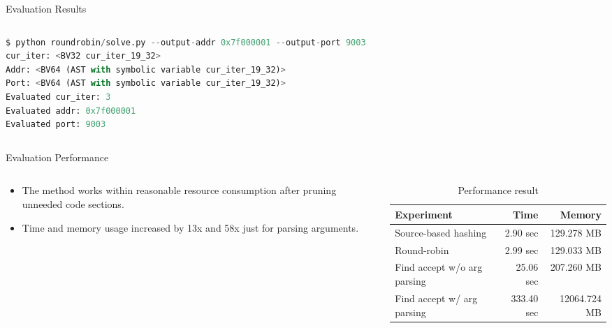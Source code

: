 \documentclass[final,hyperref={pdfpagelabels=false}]{beamer}
\begin{document}
\begin{frame}[t,fragile]
\begin{columns}[t]
\begin{column}{.47\textwidth}
\begin{block}{Evaluation Results}
\begin{columns}
\begin{column}{.48\textwidth}
\begin{lstlisting}[language=python,basicstyle=\footnotesize\ttfamily]
$ python roundrobin/solve.py --output-addr 0x7f000001 --output-port 9003
cur_iter: <BV32 cur_iter_19_32>
Addr: <BV64 (AST with symbolic variable cur_iter_19_32)>
Port: <BV64 (AST with symbolic variable cur_iter_19_32)>
Evaluated cur_iter: 3
Evaluated addr: 0x7f000001
Evaluated port: 9003
\end{lstlisting}
\end{column}
\begin{column}{.40\textwidth}
\end{column}
\end{columns}

\end{block}


\begin{block}{Evaluation Performance}

\begin{columns}
\begin{column}{.39\textwidth}
\begin{itemize}
    \item The method works within reasonable resource consumption after pruning
        unneeded code sections.
    \item Time and memory usage increased by 13x and 58x just for parsing
        arguments.
\end{itemize}
\end{column}

\begin{column}{.58\textwidth}
\begin{table}
\begin{tabular}{l r r}
\toprule
\textbf{Experiment} & \textbf{Time} & \textbf{Memory}\\
\midrule
Source-based hashing        & 2.90 sec & 129.278 MB \\
Round-robin                 & 2.99 sec & 129.033 MB \\
Find accept w/o arg parsing & 25.06 sec & 207.260 MB \\
Find accept w/ arg parsing   & 333.40 sec & 12064.724 MB \\
\bottomrule
\end{tabular}
\caption{Performance result}
\end{table}
\end{column}
\end{columns}


\end{block}
\end{column}
\end{columns}
\end{frame}
\end{document}
